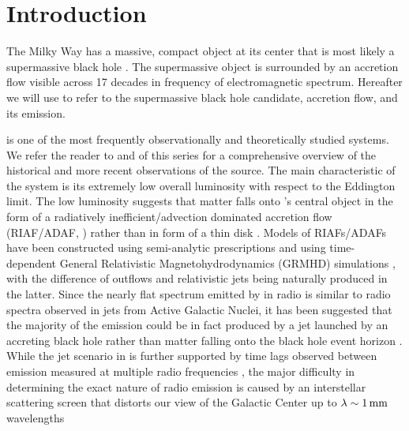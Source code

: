\section{Introduction}
\label{sec:intro}

The Milky Way has a massive, compact object at its center that is most likely a supermassive black hole \citep{2019Sci...365..664D, 2019A&A...625L..10G}.
The supermassive object is surrounded by an accretion flow visible across 17 decades in frequency of electromagnetic spectrum.
Hereafter we will use \sgra to refer to the supermassive black hole candidate, accretion flow, and its emission.

\sgra is one of the most frequently observationally and theoretically studied systems.
We refer the reader to  and  of this series for a comprehensive overview of the historical and more recent observations of the source.
The main characteristic of the \sgra system is its extremely low overall luminosity with respect to the Eddington limit.
The low luminosity suggests that matter falls onto \sgra's central object in the form of a radiatively inefficient/advection dominated accretion flow (RIAF/ADAF, \citealt{1977ApJ...214..840I,1994ApJ...428L..13N, 1995ApJ...444..231N, 1995ApJ...452..710N, 1996A&AS..120C.287N, 1998ApJ...492..554N,2014ARA&A..52..529Y}) rather than in form of a thin disk \citep{1973A&A....24..337S}.
Models of RIAFs/ADAFs have been constructed using semi-analytic prescriptions \citep[e.g.,][]{1995Natur.374..623N,2000ApJ...541..234O, 2009ApJ...697...45B,2011ApJ...735..110B} and using  time-dependent General Relativistic Magnetohydrodynamics (GRMHD) simulations \citep[e.g.,][]{2000ApJ...528..462H, 2003ApJ...589..458D, 2003ApJ...589..444G, 2007CQGra..24S.235G, 2012ApJS..201....9F, 2014ApJ...796...22F, 2016ApJS..225...22W, 2017ApJS..231...17A, 2018JPhCS1031a2008O, 2019A&A...629A..61O, 2019ApJS..243...26P}, with the difference of outflows and relativistic jets being naturally produced in the latter.
Since the nearly flat spectrum emitted by \sgra in radio is similar to radio spectra observed in jets from Active Galactic Nuclei, it has been suggested that the majority of the \sgra emission could be in fact produced by a jet launched by an accreting black hole rather than matter falling onto the black hole event horizon \citep{2000A&A...362..113F}.
While the jet scenario in \sgra is further supported by time lags observed between emission measured at multiple radio frequencies \citep{2021arXiv210713402B}, the major difficulty in determining the exact nature of \sgra radio emission is caused by an interstellar scattering screen that distorts our view of the Galactic Center up to $\lambda \sim 1\,\mathrm{mm}$ wavelengths
